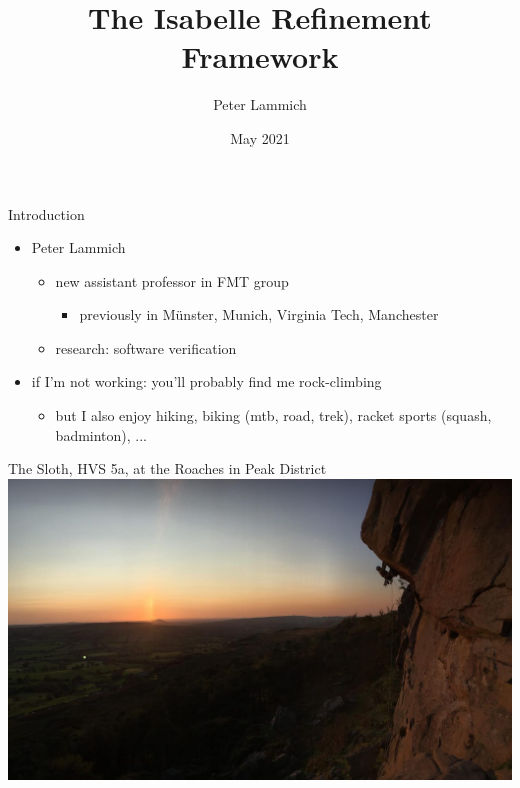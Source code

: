 \documentclass[fleqn]{beamer}
\title{The Isabelle Refinement Framework}
\author[Peter Lammich]{Peter Lammich}
\institute[UoM] %
{ University of Twente}
\date {May 2021}
\begin{document}
% 

\begin{frame}
  \titlepage
\end{frame}


\newcommand{\insertsectitle}{}

\setbeamertemplate{frametitle}{\vspace{.7em}\insertframetitle\hfill \small\raisebox{10pt}{\insertsectitle}}
\begin{frame}{Introduction}
  \begin{itemize}
   \item<+-> Peter Lammich
    \begin{itemize}
     \item new assistant professor in FMT group
      \begin{itemize}
       \item previously in M\"unster, Munich, Virginia Tech, Manchester
      \end{itemize}
     \item research: software verification

    \end{itemize}
   \item<+-> if I'm not working: you'll probably find me rock-climbing
    \begin{itemize}
     \item<+-> but I also enjoy hiking, biking (mtb, road, trek), racket sports (squash, badminton), ...


    \end{itemize}
  \end{itemize}
\end{frame}
\begin{frame}{The Sloth, HVS 5a, at the Roaches in Peak District}
  \includegraphics[width=\textwidth]{sloth.jpg}

\end{frame}
\end{document}
